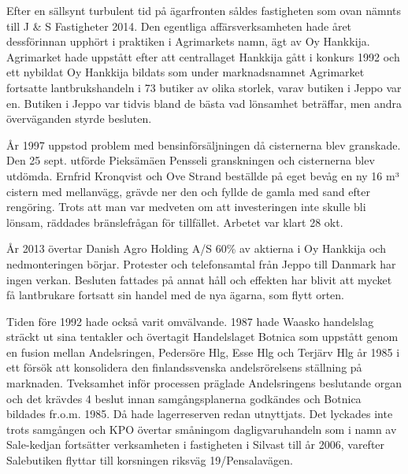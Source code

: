 
Efter en sällsynt turbulent tid på ägarfronten såldes fastigheten som ovan nämnts till J \& S Fastigheter 2014. Den egentliga affärsverksamheten hade året dessförinnan upphört i praktiken i Agrimarkets namn, ägt av Oy Hankkija. Agrimarket hade uppstått efter att centrallaget Hankkija gått i konkurs 1992 och ett nybildat Oy Hankkija bildats som under marknadsnamnet Agrimarket fortsatte lantbrukshandeln i 73 butiker av olika storlek, varav butiken i Jeppo var en. Butiken i Jeppo var tidvis bland de bästa vad lönsamhet beträffar, men andra överväganden styrde besluten.

År 1997 uppstod problem med bensinförsäljningen då cisternerna blev granskade. Den 25 sept. utförde Pieksämäen Pensseli granskningen och cisternerna blev utdömda. Ernfrid Kronqvist och Ove Strand beställde på eget bevåg en ny 16 m³ cistern med mellanvägg, grävde ner den och fyllde de gamla med sand efter rengöring. Trots att man var medveten om att investeringen inte skulle bli lönsam, räddades bränslefrågan för tillfället. Arbetet var klart 28 okt.

År 2013 övertar Danish Agro Holding A/S 60\% av aktierna i Oy Hankkija  och nedmonteringen börjar. Protester och telefonsamtal från Jeppo till Danmark har ingen verkan. Besluten fattades på annat håll och effekten har blivit att mycket få lantbrukare fortsatt sin handel med de nya ägarna, som flytt orten.


Tiden före 1992 hade också varit omvälvande. 1987 hade Waasko handelslag sträckt ut sina tentakler och övertagit Handelslaget Botnica som uppstått genom en fusion mellan Andelsringen, Pedersöre Hlg, Esse Hlg och Terjärv Hlg år 1985 i ett försök att konsolidera den finlandssvenska andelsrörelsens ställning på marknaden. Tveksamhet inför processen präglade Andelsringens beslutande organ och det krävdes 4 beslut innan samgångsplanerna godkändes och Botnica bildades fr.o.m. 1985. Då hade lagerreserven redan utnyttjats. Det lyckades inte trots samgången och KPO övertar småningom dagligvaruhandeln som i namn av Sale-kedjan fortsätter verksamheten i fastigheten i Silvast till år 2006, varefter Salebutiken flyttar till korsningen riksväg 19/Pensalavägen.


